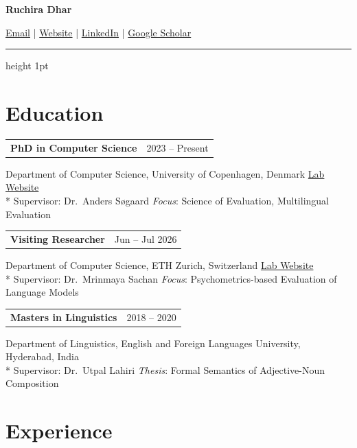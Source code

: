 \documentclass[11pt,letterpaper]{article}
\makeatletter
\newcommand{\entry}[2]{%
  \par\addvspace{7pt}\Needspace{5\baselineskip}%
  \noindent\begin{tabularx}{\linewidth}{@{}Xr@{}}%
    \textbf{#1} & {\small\sffamily\color{muted}#2}%
  \end{tabularx}\par\nobreak\vspace{-3pt}%
}
\makeatother
\begin{document}
{\fontsize{30}{34}\selectfont\sffamily\bfseries\color{accent}Ruchira Dhar\par}
\vspace{3pt}
{\small\sffamily
  \href{mailto:rudh@di.ku.dk}{Email}
  \quad\textcolor{rulecolor}{|}\quad
  \href{https://ruchiradhar.github.io}{Website}
  \quad\textcolor{rulecolor}{|}\quad
  \href{https://linkedin.com/in/ruchira-dhar-105427122}{LinkedIn}
  \quad\textcolor{rulecolor}{|}\quad
  \href{https://scholar.google.com/citations?user=YgAMn9gAAAAJ}{Google Scholar}\par}
\vspace{5pt}
{\color{accent}\hrule height 1pt}
\vspace{2pt}

\section{Education}

\entry{PhD in Computer Science}{2023 -- Present}
{\small
Department of Computer Science, University of Copenhagen, Denmark\hfill
{\footnotesize\sffamily\href{https://coastalcph.github.io/}{Lab Website}}\\*
Supervisor: Dr.\ Anders S\o{}gaard\enspace\textperiodcentered\enspace
\textit{Focus}: Science of Evaluation, Multilingual Evaluation\par}

\entry{Visiting Researcher}{Jun -- Jul 2026}
{\small
Department of Computer Science, ETH Zurich, Switzerland\hfill
{\footnotesize\sffamily\href{https://lre.inf.ethz.ch/}{Lab Website}}\\*
Supervisor: Dr.\ Mrinmaya Sachan\enspace\textperiodcentered\enspace
\textit{Focus}: Psychometrics-based Evaluation of Language Models\par}

\entry{Masters in Linguistics}{2018 -- 2020}
{\small
Department of Linguistics, English and Foreign Languages University, Hyderabad, India\\*
Supervisor: Dr.\ Utpal Lahiri\enspace\textperiodcentered\enspace
\textit{Thesis}: Formal Semantics of Adjective-Noun Composition\par}

\section{Experience}
\end{document}
